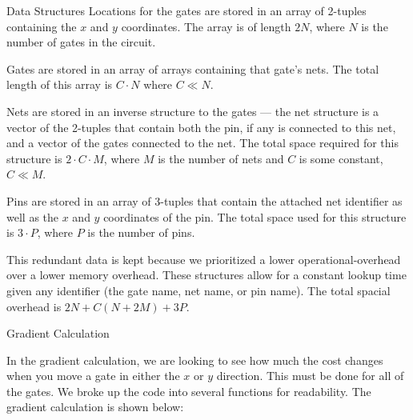 \documentclass[9pt]{extarticle}
\begin{document}
\begin{homeworkProblem}
    
    \begin{homeworkSection}{Data Structures}
                Locations for the gates are stored in an array of 2-tuples containing the $x$ and $y$ coordinates. The array is of length $2N$, where $N$ is the number of gates in the circuit. \vspace{0.2cm}

                Gates are stored in an array of arrays containing that gate's nets. The total length of this array is $C \cdot N$ where $C \ll N$. \vspace{0.2cm}
                
                Nets are stored in an inverse structure to the gates --- the net structure is a vector of the 2-tuples that contain both the pin, if any is connected to this net, and a vector of the gates connected to the net. The total space required for this structure is $2\cdot C \cdot M$, where $M$ is the number of nets and $C$ is some constant, $C \ll M$.\vspace{0.2cm}
                
                Pins are stored in an array of 3-tuples that contain the attached net identifier as well as the $x$ and $y$ coordinates of the pin. The total space used for this structure is $3\cdot P$, where $P$ is the number of pins.\vspace{0.2cm}
                
                This redundant data is kept because we prioritized a lower operational-overhead over a lower memory overhead. These structures allow for a constant lookup time given any identifier (the gate name, net name, or pin name). The total spacial overhead is $2N + C(N+2M) + 3P$.         
    \end{homeworkSection}
    
    \begin{homeworkSection}{Gradient Calculation}

        In the gradient calculation, we are looking to see how much the cost changes when you move a gate in either the $x$ or $y$ direction. This must be done for all of the gates. We broke up the code into several functions for readability. The gradient calculation is shown below:


\end{homeworkSection}
\end{homeworkProblem}
\end{document}
